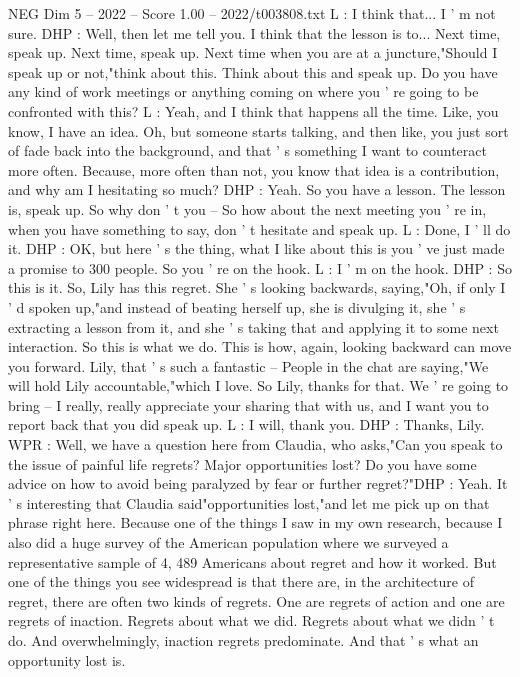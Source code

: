 \begin{textsample}{NEG Dim 5 – 2022 – Score 1.00 – 2022/t003808.txt}
L : I think that...
I ' m not sure.
DHP : Well, then let me tell you.
I think that the lesson is to...
Next time, speak up.
Next time, speak up.
Next time when you are at a juncture,"Should I speak up or not,"think about this.
Think about this and speak up.
Do you have any kind of work meetings or anything coming on where you ' re going to be confronted with this?
L : Yeah, and I think that happens all the time.
Like, you know, I have an idea.
Oh, but someone starts talking, and then like, you just sort of fade back into the background, and that ' s something I want to counteract more often.
Because, more often than not, you know that idea is a contribution, and why am I hesitating so much?
DHP : Yeah.
So you have a lesson.
The lesson is, speak up.
So why don ' t you -- So how about the next meeting you ' re in, when you have something to say, don ' t hesitate and speak up.
L : Done, I ' ll do it.
DHP : OK, but here ' s the thing, what I like about this is you ' ve just made a promise to 300 people.
So you ' re on the hook.
L : I ' m on the hook.
DHP : So this is it.
So, Lily has this regret.
She ' s looking backwards, saying,"Oh, if only I ' d spoken up,"and instead of beating herself up, she is divulging it, she ' s extracting a lesson from it, and she ' s taking that and applying it to some next interaction.
So this is what we do.
This is how, again, looking backward can move you forward.
Lily, that ' s such a fantastic -- People in the chat are saying,"We will hold Lily accountable,"which I love.
So Lily, thanks for that.
We ' re going to bring -- I really, really appreciate your sharing that with us, and I want you to report back that you did speak up.
L : I will, thank you.
DHP : Thanks, Lily.
WPR : Well, we have a question here from Claudia, who asks,"Can you speak to the issue of painful life regrets?
Major opportunities lost?
Do you have some advice on how to avoid being paralyzed by fear or further regret?"DHP : Yeah.
It ' s interesting that Claudia said"opportunities lost,"and let me pick up on that phrase right here.
Because one of the things I saw in my own research, because I also did a huge survey of the American population where we surveyed a representative sample of 4, 489 Americans about regret and how it worked.
But one of the things you see widespread is that there are, in the architecture of regret, there are often two kinds of regrets.
One are regrets of action and one are regrets of inaction.
Regrets about what we did.
Regrets about what we didn ' t do.
And overwhelmingly, inaction regrets predominate.
And that ' s what an opportunity lost is.

\end{textsample}
